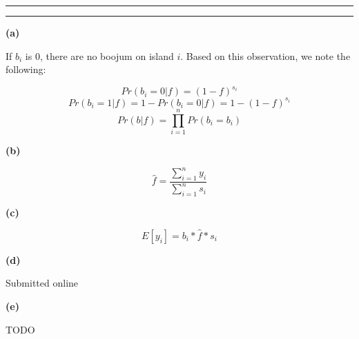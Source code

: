 \documentclass[11pt,letterpaper]{article}
\newcommand{\question}[1] {\vspace{.25in} \hrule\vspace{0.5em}
\noindent{\bf #1} \vspace{0.5em}
\hrule \vspace{.10in}}
\renewcommand{\part}[1] {\vspace{.10in} {\bf (#1)}}
\begin{document}
\question{4}
\part{a}

If $b_i$ is 0, there are no boojum on island $i$. Based on this observation, we note the following:

$$Pr(b_i = 0| f) = (1-f)^{s_i}$$
$$Pr(b_i = 1| f) = 1 - Pr(b_i = 0 | f) = 1 - (1-f)^{s_i}$$
$$Pr(b | f) = \prod_{i=1}^n Pr(b_i = b_i)$$

\part{b}

$$\hat{f} = \frac{\sum_{i=1}^n y_i}{\sum_{i=1}^n s_i} $$

\part{c}

$$E[y_i] = b_i * \hat{f} * s_i$$

\part{d}

Submitted online

\part{e}

TODO
\end{document}
